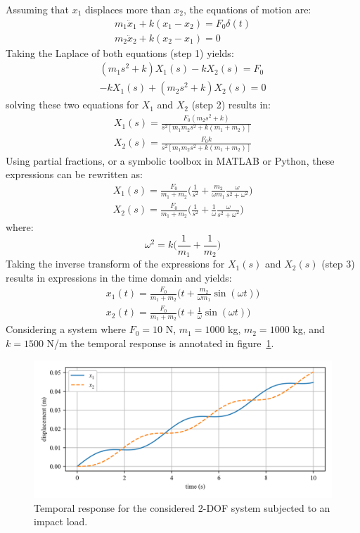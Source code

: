 \documentclass[12pt,letter]{article}
\begin{document}
\begin{example}
	\noindent Assuming that $x_1$ displaces more than $x_2$, the equations of motion are:
	\begin{eqnarray}
	m_1\ddot{x}_1 + k(x_1-x_2)  = F_0 \delta (t) \\
	m_2\ddot{x}_2 + k(x_2-x_1)  = 0  \nonumber
	\end{eqnarray}
	Taking the Laplace of both equations (step 1) yields:
	\begin{eqnarray}
	(m_1 s^2 +k)X_1(s) - k X_2(s) = F_0 \\
	-k X_1(s) + (m_2 s^2 + k) X_2(s) = 0  \nonumber
	\end{eqnarray}
	solving these two equations for $X_1$ and $X_2$ (step 2) results in:
	\begin{eqnarray}
	X_1(s) = \frac{F_0(m_2 s^2 +k)}{s^2 [m_1 m_2 s^2 + k (m_1 + m_2)]} \\
	X_2(s) = \frac{F_0 k}{s^2 [m_1 m_2 s^2 + k (m_1 + m_2)]} \nonumber
	\end{eqnarray}
	Using partial fractions, or a symbolic toolbox in MATLAB or Python, these expressions can be rewritten as:
	\begin{eqnarray}
	X_1(s) = \frac{F_0}{m_1 + m_2} \bigg( \frac{1}{s^2} + \frac{m_2}{\omega m_1} \frac{\omega}{s^2 + \omega^2} \bigg) \\
	X_2(s) = \frac{F_0}{m_1 + m_2} \bigg( \frac{1}{s^2} + \frac{1}{\omega} \frac{\omega}{s^2 + \omega^2} \bigg) \nonumber
	\end{eqnarray}
	where:
	\begin{equation}
	\omega^2 = k \bigg( \frac{1}{m_1} + \frac{1}{m_2} \bigg)
	\end{equation}
	Taking the inverse transform of the expressions for $X_1(s)$ and $X_2(s)$ (step 3) results in expressions in the time domain and yields:
	\begin{eqnarray}
	x_1(t) = \frac{F_0}{m_1 + m_2} \bigg( t + \frac{m_2}{\omega m_1} \sin (\omega t) \bigg) \\
	x_2(t) = \frac{F_0}{m_1 + m_2} \bigg( t + \frac{1}{\omega} \sin (\omega t) \bigg) \nonumber
	\end{eqnarray}
	Considering a system where $F_0=10$ N, $m_1=1000$ kg, $m_2=1000$ kg, and $k=1500$ N/m the temporal response is annotated in figure~\ref{fig:2_DOF_impact_example}. 
	
	
	\begin{figure}[H]
		\centering
		\includegraphics[width=\linewidth]{../figures/2_DOF_impact_example.png}
		\caption{Temporal response for the considered 2-DOF system subjected to an impact load.}
		\label{fig:2_DOF_impact_example}
	\end{figure}
	

\end{example}
\end{document}
